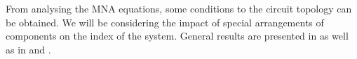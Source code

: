 %
%
%
%
%
%	
%
%


From analysing the MNA equations, some conditions to the circuit topology can be obtained. We will be considering the impact of special arrangements of components on the index of the system. General results are presented in \cite{Tischendorf2005Topological} as well as in \cite{shashkov_tuprints27452} and \cite{Reis2014}.



\newpage


